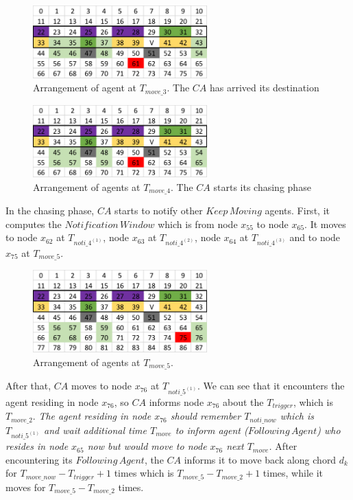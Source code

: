 \begin{figure}[H]
  \centering  
  \includegraphics[width=0.6\textwidth]{figures/T611.png}
  \caption{Arrangement of agent at $T_{move\_3}$. The $CA$ has arrived its destination}\label{fig:T611}
\end{figure}

\begin{figure}[H]
  \centering  
  \includegraphics[width=0.6\textwidth]{figures/T612.png}
  \caption{Arrangement of agents at $T_{move\_4}$. The $CA$ starts its chasing phase}\label{fig:T612}
\end{figure}

In the chasing phase, $CA$ starts to notify other $Keep\,Moving$ agents. First, it computes the $Notification\,Window$ which is from node $x_{55}$ to node $x_{65}$. It moves to node $x_{62}$ at $T_{noti\_4^{(1)}}$, node $x_{63}$ at $T_{noti\_4^{(2)}}$, node $x_{64}$ at $T_{noti\_4^{(3)}}$ and to node $x_{75}$ at $T_{move\_5}$. 

\begin{figure}[H]
  \centering  
  \includegraphics[width=0.6\textwidth]{figures/T75.png}
  \caption{Arrangement of agents at $T_{move\_5}$. }\label{fig:T75}
\end{figure}
After that, $CA$ moves to node $x_{76}$ at $T_{noti\_5^{(1)}}$. We can see that it encounters the agent residing in node $x_{76}$, so $CA$ informs node $x_{76}$ about the $T_{trigger}$, which is $T_{move\_2}$. {\em The agent residing in node $x_{76}$ should remember $T_{noti\_now}$ which is $T_{noti\_5^{(1)}}$ and wait additional time  $T_{move}$ to inform agent ($Following\,Agent$) who resides in node $x_{65}$ now but would move to node $x_{76}$ next $T_{move}$. } After encountering its $Following\,Agent$, the $CA$ informs it to move back along chord $d_k$ for $T_{move\_now}-T_{trigger} +1$ times which is $T_{move\_5}- T_{move\_2}+1$ times,  while it moves for $T_{move\_5}-T_{move\_2}$ times. 

